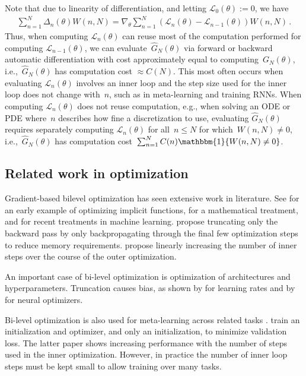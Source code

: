 Note that due to linearity of differentiation, and letting ${\mathcal{L}_0(\theta) := 0}$, we have
\begin{align*}
\sum_{n=1}^N\! \Delta_n(\theta) W(n, N) =
\nabla_\theta\!\! \sum_{n=1}^N\!
(\mathcal{L}_n(\theta)\! -\! \mathcal{L}_{n-1}(\theta))  W(n, N)\,.
\end{align*}
Thus, when computing $\mathcal{L}_n(\theta)$ can reuse most of the computation performed for computing $\mathcal{L}_{n-1}(\theta)$, we can evaluate~$\hat{G}_N(\theta)$ via forward or backward automatic differentiation with cost approximately equal to computing~$G_N(\theta)$, i.e.,~$\hat{G}_N(\theta)$ has computation cost $\approx C(N)$.
This most often occurs when evaluating $\mathcal{L}_n(\theta)$ involves an inner loop and the step size used for the inner loop does not change with~$n$, such as in meta-learning and training RNNs.
When computing $\mathcal{L}_n(\theta)$ does not reuse computation, e.g., when solving an ODE or PDE where~$n$ describes how fine a discretization to use, evaluating $\hat{G}_N(\theta)$ requires separately computing $\mathcal{L}_n(\theta)$ for all~${n \leq N}$ for which~${W(n, N) \neq 0}$, i.e.,~$\hat{G}_N(\theta)$ has computation cost~${\sum_{n=1}^N C(n) \mathbbm{1} \{W(n, N) \neq 0\}}$.

\subsection{Related work in optimization}
Gradient-based bilevel optimization has seen extensive work in literature.
See \citet{jameson1988aerodynamic} for an early example of optimizing implicit functions, \citet{christianson1998reverse} for a mathematical treatment, and \citet{maclaurin2015gradient, franceschi2017forward} for recent treatments in machine learning.
\citet{shaban2018truncated} propose truncating only the backward pass by only backpropagating through the final few optimization steps to reduce memory requirements.
\citet{metz2018learned} propose linearly increasing the number of inner steps over the course of the outer optimization.

An important case of bi-level optimization is optimization of architectures and hyperparameters.
Truncation causes bias, as shown by \citet{wu2018understanding} for learning rates and by \citet{metz2018learned} for neural optimizers.

Bi-level optimization is also used for meta-learning across related tasks \citep{schmidhuber1987evolutionary, bengio1992optimization}.
\citet{ravi2016optimization} train an initialization and optimizer, and \citet{finn2017model} only an initialization, to minimize validation loss.
The latter paper shows increasing performance with the number of steps used in the inner optimization.
However, in practice the number of inner loop steps must be kept small to allow training over many tasks.


